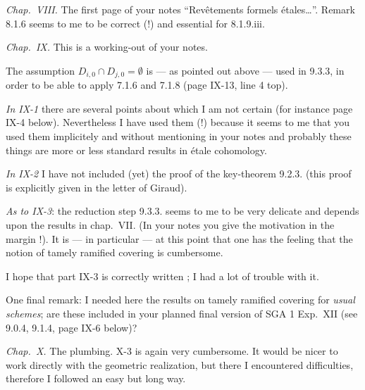 \documentclass[11pt,a4paper]{article}
\begin{document}
\emph{Chap.\ VIII.} The first page of your notes ``Revêtements formels
étales\ldots''. Remark 8.1.6 seems to me to be correct (!)  and essential for 8.1.9.iii.

\emph{Chap.\ IX.} This is a working-out of your notes.

The assumption $D_{i,0} \cap D_{j,0} = \emptyset$ is --- as pointed out above
--- used in 9.3.3, in order to be able to apply 7.1.6 and 7.1.8 (page IX-13,
line 4 top).

\emph{In IX-1} there are several points about which I am not certain (for
instance page IX-4 below). Nevertheless I have used them (!) because it seems
to me that you used them implicitely and without mentioning in your notes and
probably these things are more or less standard results in étale cohomology.

\emph{In IX-2} I have not included (yet) the proof of the key-theorem 9.2.3.
(this proof is explicitly given in the letter of Giraud).

\emph{As to IX-3}: the reduction step 9.3.3. seems to me to be very delicate
and depends upon the results in chap.\ VII. (In your notes you give the
motivation in the margin !). It is --- in particular --- at this point that one
has the feeling that the notion of tamely ramified covering is cumbersome.

I hope that part IX-3 is correctly written ; I had a lot of trouble with it.

One final remark: I needed here the results on tamely ramified covering
for \emph{usual schemes}; are these included in your planned final version of
SGA 1 Exp.\ XII (see 9.0.4, 9.1.4, page IX-6 below)?

\emph{Chap.\ X.} The plumbing. X-3 is again very cumbersome. It would be
nicer to work directly with the geometric realization, but there I
encountered difficulties, therefore I followed an easy but long way.
\end{document}
